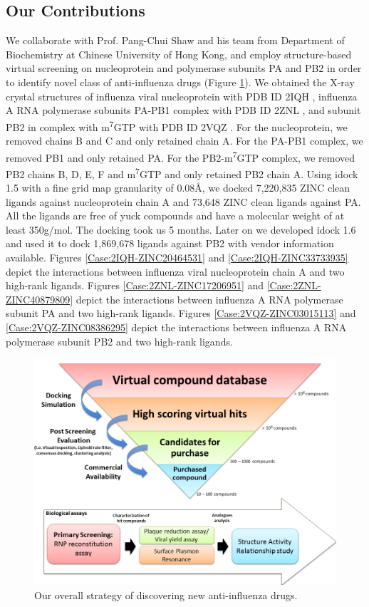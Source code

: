 \subsection{Our Contributions}

We collaborate with Prof. Pang-Chui Shaw and his team from Department of Biochemistry at Chinese University of Hong Kong, and employ structure-based virtual screening on nucleoprotein and polymerase subunits PA and PB2 in order to identify novel class of anti-influenza drugs (Figure \ref{Case:InfluenzaProjectFlow}). We obtained the X-ray crystal structures of influenza viral nucleoprotein with PDB ID 2IQH \citep{1140}, influenza A RNA polymerase subunits PA-PB1 complex with PDB ID 2ZNL \citep{1141}, and subunit PB2 in complex with m\textsuperscript{7}GTP with PDB ID 2VQZ \citep{1192}. For the nucleoprotein, we removed chains B and C and only retained chain A. For the PA-PB1 complex, we removed PB1 and only retained PA. For the PB2-m\textsuperscript{7}GTP complex, we removed PB2 chains B, D, E, F and m\textsuperscript{7}GTP and only retained PB2 chain A. Using idock 1.5 with a fine grid map granularity of 0.08\AA, we docked 7,220,835 ZINC \citep{532} clean ligands against nucleoprotein chain A and 73,648 ZINC clean ligands against PA. All the ligands are free of yuck compounds and have a molecular weight of at least 350g/mol. The docking took us 5 months. Later on we developed idock 1.6 and used it to dock 1,869,678 ligands against PB2 with vendor information available. Figures \ref{Case:2IQH-ZINC20464531} and \ref{Case:2IQH-ZINC33733935} depict the interactions between influenza viral nucleoprotein chain A and two high-rank ligands. Figures \ref{Case:2ZNL-ZINC17206951} and \ref{Case:2ZNL-ZINC40879809} depict the interactions between influenza A RNA polymerase subunit PA and two high-rank ligands. Figures \ref{Case:2VQZ-ZINC03015113} and \ref{Case:2VQZ-ZINC08386295} depict the interactions between influenza A RNA polymerase subunit PB2 and two high-rank ligands.

\begin{figure}[t]
\centering
\includegraphics[width=\linewidth]{Case/InfluenzaProjectFlow.png}
\caption{Our overall strategy of discovering new anti-influenza drugs.}
\label{Case:InfluenzaProjectFlow}
\end{figure}

